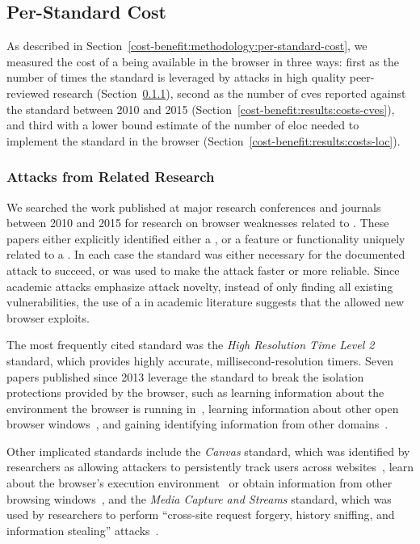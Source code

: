 \subsection{Per-Standard Cost}
\label{cost-benefit:results:results-costs}
As described in Section~\ref{cost-benefit:methodology:per-standard-cost}, we
measured the cost of a \WAS being available in the browser in three ways: first
as the number of times the standard is leveraged by attacks in high quality
peer-reviewed research (Section~\ref{cost-benefit:results:costs-research}),
second as the number of \gls{cve}s reported against the standard between 2010
and 2015 (Section~\ref{cost-benefit:results:costs-cves}), and third with a
lower bound estimate of the number of \gls{eloc} needed to implement the
standard in the browser (Section~\ref{cost-benefit:results:costs-loc}).


\subsubsection{Attacks from Related Research}
\label{cost-benefit:results:costs-research}
We searched the work published at major research conferences and journals
between 2010 and 2015 for research on browser weaknesses related to \WASs.
These papers either explicitly identified either a \WAS, or a feature or
functionality uniquely related to a \WAS.  In each case the standard was either
necessary for the documented attack to succeed, or was used to make the attack
faster or more reliable.  Since academic attacks emphasize attack novelty,
instead of only finding all existing vulnerabilities, the use of a \WAS in
academic literature suggests that the \WAS allowed new browser exploits.

The most frequently cited standard was the \textit{High Resolution Time Level
2}~\cite{highres2016w3c} standard, which provides highly accurate,
millisecond-resolution timers.  Seven papers published since 2013 leverage the
standard to break the isolation protections provided by the browser, such as
learning information about the environment the browser is running
in~\cite{ho2014tick,oren2015spy,gruss2015practical}, learning information about
other open browser
windows~\cite{andrysco2015subnormal,kotcher2013cross,gruss2015practical}, and
gaining identifying information from other domains~\cite{van2015clock}.

Other implicated standards include the \textit{Canvas} standard, which was
identified by researchers as allowing attackers to persistently track users
across websites~\cite{acar2014web}, learn about the browser's execution
environment~\cite{ho2014tick} or obtain information from other browsing
windows~\cite{kotcher2013cross}, and the \textit{Media Capture and Streams}
standard, which was used by researchers to perform ``cross-site request
forgery, history sniffing, and information stealing''
attacks~\cite{tian2014all}.

